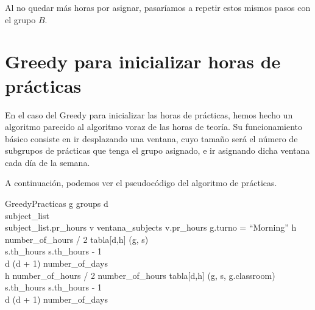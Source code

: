 Al no quedar más horas por asignar, pasaríamos a repetir estos mismos pasos con el grupo $B$.

\section{Greedy para inicializar horas de prácticas}
En el caso del Greedy para inicializar las horas de prácticas, hemos hecho un algoritmo parecido al algoritmo voraz de las horas de teoría. Su funcionamiento básico consiste en ir desplazando una ventana, cuyo tamaño será el número de subgrupos de prácticas que tenga el grupo asignado, e ir asignando dicha ventana cada día de la semana. 

A continuación, podemos ver el pseudocódigo del algoritmo de prácticas.

\begin{pseudocode}{GreedyPracticas}{ }
    \label{greedypracticas}
    \FOREACH g \in groups \DO
    \BEGIN
        d  \\
        subject\_list \GETS {}\\
        \WHILE \sum subject\_list.pr\_hours  \DO
        \BEGIN
            \FOREACH v \in ventana\_subjects \DO
            \BEGIN
                \IF v.pr\_hours  \DO
                \BEGIN
                    \IF g.turno = ``Morning'' \DO
                    \BEGIN
                        \FOR h  \TO number\_of\_hours / 2 \DO
                        \BEGIN
                            \IF {} \DO
                            \BEGIN
                                tabla[d,h] \GETS (g, s)\\
                                s.th\_hours \GETS s.th\_hours - 1\\
                                d \GETS (d + 1) \bmod number\_of\_days\\
                                \BREAK
                            \END
                        \END
                    \END
                    \ELSE \DO
                    \BEGIN
                        \FOR h \GETS number\_of\_hours / 2 \TO number\_of\_hours \DO
                        \BEGIN
                            \IF {} \DO
                            \BEGIN
                                tabla[d,h] \GETS (g, s, g.classroom)\\
                                s.th\_hours \GETS s.th\_hours - 1\\
                                d \GETS (d + 1) \bmod number\_of\_days\\
                                \BREAK
                            \END
                        \END
                    \END
                \END
            \END
        \END
    \END
\end{pseudocode}

